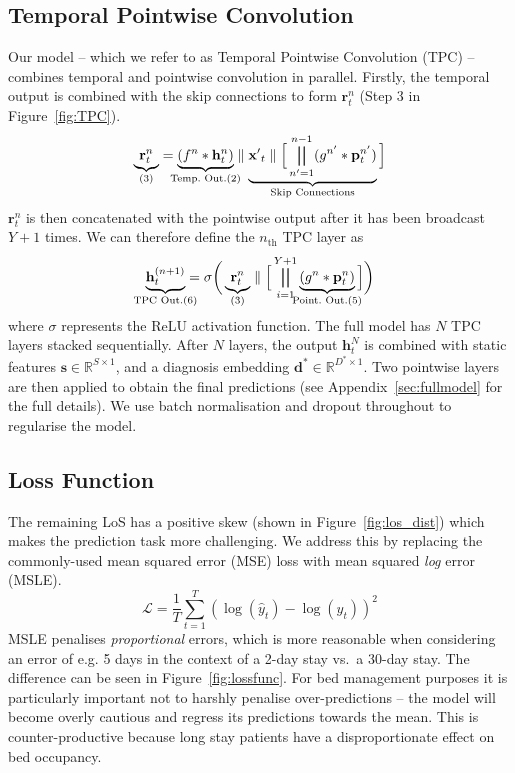 \documentclass[sigconf]{acmart}
\begin{document}
\subsection{Temporal Pointwise Convolution}
Our model -- which we refer to as Temporal Pointwise Convolution (TPC) -- combines temporal and pointwise convolution in parallel. Firstly, the temporal output is combined with the skip connections to form $\mathbf{r}_t^{n}$ (Step 3 in Figure~\ref{fig:TPC}).
\begin{equation}
    \underbrace{\mathbf{r}_t^{n}}_{(3)} = \underbrace{(f^{n} \ast \mathbf{h}_t^{n})}_{\mathclap{\text{Temp.\ Out.}(2)}} \parallel \underbrace{\mathbf{x'}_t \parallel \Big[ \bigparallel_{n'=1}^{n-1} (g^{n'} \ast \mathbf{p}_t^{n'})}_{\mathclap{\text{Skip Connections}}}\Big]
\end{equation}
$\mathbf{r}_t^{n}$ is then concatenated with the pointwise output after it has been broadcast $Y+1$ times. We can therefore define the $n_\text{th}$ TPC layer as
\begin{equation}
    \underbrace{\mathbf{h}_t^{(n+1)}}_{\mathclap{\text{TPC Out.}(6)}} = \sigma\bigg(\underbrace{\mathbf{r}_t^{n}}_{(3)} \parallel \Big[ \bigparallel_{i=1}^{Y+1} \underbrace{(g^{n} \ast \mathbf{p}_t^{n})}_{\mathclap{\text{Point.\ Out.}(5)}}\Big]\bigg)
\end{equation}
where $\sigma$ represents the ReLU activation function. The full model has $N$ TPC layers stacked sequentially. After $N$ layers, the output $\mathbf{h}_t^{N}$ is combined with static features $\mathbf{s}\in\mathbb{R}^{S\times 1}$, and a diagnosis embedding $\mathbf{d^*}\in\mathbb{R}^{D^*\times 1}$. Two pointwise layers are then applied to obtain the final predictions (see Appendix~\ref{sec:fullmodel} for the full details). We use batch normalisation \citep{Ioffe2015} and dropout \citep{Srivastava2014} throughout to regularise the model. 

\subsection{Loss Function}
The remaining LoS has a positive skew (shown in Figure~\ref{fig:los_dist}) which makes the prediction task more challenging. We address this by replacing the commonly-used mean squared error (MSE) loss with mean squared \textit{log} error (MSLE). 
\begin{equation}
    \mathcal{L} = \frac{1}{T}\sum_{t=1}^T(\log(\hat{y}_t) - \log(y_t))^2
\end{equation}
MSLE penalises \textit{proportional} errors, which is more reasonable when considering an error of e.g. 5 days in the context of a 2-day stay vs.\ a 30-day stay. The difference can be seen in Figure~\ref{fig:lossfunc}. For bed management purposes it is particularly important not to harshly penalise over-predictions -- the model will become overly cautious and regress its predictions towards the mean. This is counter-productive because long stay patients have a disproportionate effect on bed occupancy.
\end{document}

